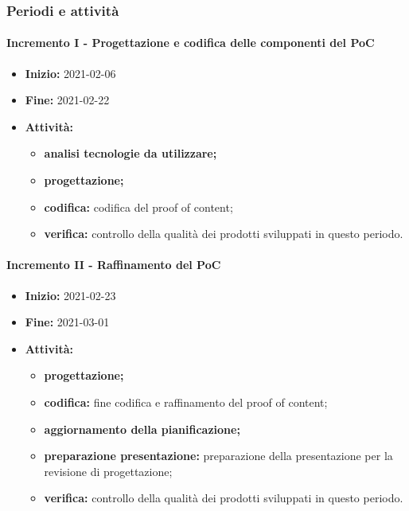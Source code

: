 \subsubsection{Periodi e attività}

\paragraph[Incremento I]{Incremento I - \textnormal{Progettazione e codifica delle componenti del PoC}}
\begin{itemize}
    \item [] \textbf{Inizio:} 2021-02-06
    \item [] \textbf{Fine:} 2021-02-22
    \item [] \textbf{Attività:}
          \begin{itemize}
              \item \textbf{analisi tecnologie da utilizzare;}
              \item \textbf{progettazione;}
              \item \textbf{codifica:} codifica del proof of content;
              \item \textbf{verifica:} controllo della qualità dei prodotti sviluppati in questo periodo.
          \end{itemize}
\end{itemize}

\paragraph[Incremento II]{Incremento II - \textnormal{Raffinamento del PoC}}
\begin{itemize}
    \item [] \textbf{Inizio:} 2021-02-23
    \item [] \textbf{Fine:} 2021-03-01
    \item [] \textbf{Attività:}
          \begin{itemize}
              \item \textbf{progettazione;}
              \item \textbf{codifica:} fine codifica e raffinamento del proof of content;
              \item \textbf{aggiornamento della pianificazione;}
              \item \textbf{preparazione presentazione:} preparazione della presentazione per la revisione di progettazione;
              \item \textbf{verifica:} controllo della qualità dei prodotti sviluppati in questo periodo.
          \end{itemize}
\end{itemize}

